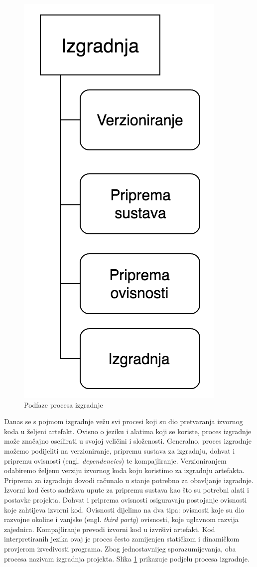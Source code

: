 \documentclass[times, utf8, diplomski, numeric]{fer}
\newcommand{\eng}[1]{(engl. \textit{#1})}
\begin{document}
\begin{figure}[b!]
\centering
\includegraphics[scale=0.5]{BuildProcess}
\caption{Podfaze procesa izgradnje}
\label{fig:BuildProcess}
\end{figure}

Danas se s pojmom izgradnje vežu svi procesi koji su dio pretvaranja izvornog koda u željeni artefakt. Ovisno o jeziku i alatima koji se koriste, proces izgradnje može značajno oscilirati u svojoj veličini i složenosti. Generalno, proces izgradnje možemo podijeliti na verzioniranje, pripremu sustava za izgradnju, dohvat i pripremu ovisnosti \eng{dependencies} te kompajliranje. Verzioniranjem odabiremo željenu verziju izvornog koda koju koristimo za izgradnju artefakta. Priprema za izgradnju dovodi računalo u stanje potrebno za obavljanje izgradnje. Izvorni kod često sadržava upute za pripremu sustava kao što su potrebni alati i postavke projekta. Dohvat i priprema ovisnosti osiguravaju postojanje ovisnosti koje zahtijeva izvorni kod. Ovisnosti dijelimo na dva tipa: ovisnosti koje su dio razvojne okoline i vanjske \eng{third party} ovisnosti, koje uglavnom razvija zajednica. Kompajliranje prevodi izvorni kod u izvršivi artefakt. Kod interpretiranih jezika ovaj je proces često zamijenjen statičkom i dinamičkom provjerom izvedivosti programa. Zbog jednostavnijeg sporazumijevanja, oba procesa nazivam izgradnja projekta. Slika \ref{fig:BuildProcess} prikazuje podjelu procesa izgradnje.
\end{document}
